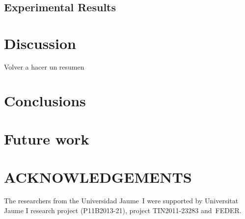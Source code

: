 \documentclass[a4paper,twoside]{article}
\begin{document}
\subsection{Experimental Results}

\section{Discussion}
\label{sec:discussion}
Volver a hacer un resumen

\section{Conclusions}
\label{sec:conclusions}


\section{Future work}
\label{sec:future}


\section*{\uppercase{Acknowledgements}}
The researchers from the Universidad Jaume~I were supported by Universitat Jaume I research project (P11B2013-21), project
TIN2011-23283 and~FEDER.


{\small
}
\end{document}
